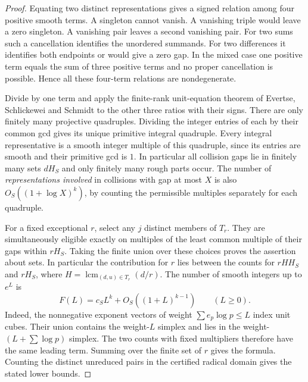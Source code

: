 \documentclass[11pt,letterpaper]{article}
\newcommand{\Hs}{H_S}
\newcommand{\lcm}{\operatorname{lcm}}
\begin{document}
\begin{proof}
Equating two distinct representations gives a signed relation among four positive smooth terms. A singleton cannot vanish. A vanishing triple would leave a zero singleton. A vanishing pair leaves a second vanishing pair. For two sums such a cancellation identifies the unordered summands. For two differences it identifies both endpoints or would give a zero gap. In the mixed case one positive term equals the sum of three positive terms and no proper cancellation is possible. Hence all these four-term relations are nondegenerate.

Divide by one term and apply the finite-rank unit-equation theorem of Evertse, Schlickewei and Schmidt \cite{ess} to the other three ratios with their signs. There are only finitely many projective quadruples. Dividing the integer entries of each by their common gcd gives its unique primitive integral quadruple. Every integral representative is a smooth integer multiple of this quadruple, since its entries are smooth and their primitive gcd is $1$. In particular all collision gaps lie in finitely many sets $d\Hs$ and only finitely many rough parts occur. The number of \emph{representations involved} in collisions with gap at most $X$ is also $O_S((1+\log X)^k)$, by counting the permissible multiples separately for each quadruple.

For a fixed exceptional $r$, select any $j$ distinct members of $T_r$. They are simultaneously eligible exactly on multiples of the least common multiple of their gaps within $r\Hs$. Taking the finite union over these choices proves the assertion about sets. In particular the contribution for $r$ lies between the counts for $rH\Hs$ and $r\Hs$, where $H=\lcm_{(d,u)\in T_r}(d/r)$. The number of smooth integers up to $e^L$ is
\begin{equation}\label{eq:lattice}
 F(L)=c_S L^k+O_S((1+L)^{k-1})\qquad(L\ge0).
\end{equation}
Indeed, the nonnegative exponent vectors of weight $\sum e_p\log p\le L$ index unit cubes. Their union contains the weight-$L$ simplex and lies in the weight-$(L+\sum\log p)$ simplex. The two counts with fixed multipliers therefore have the same leading term. Summing over the finite set of $r$ gives the formula. Counting the distinct unreduced pairs in the certified radical domain gives the stated lower bounds.
\end{proof}
\end{document}
